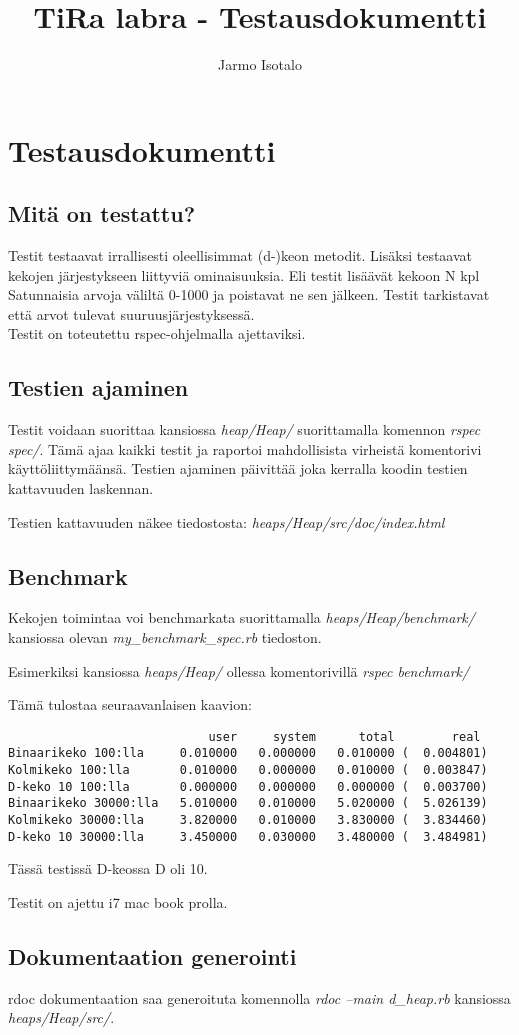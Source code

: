 \documentclass[a4paper,12pt]{article}
\begin{document}
\title{TiRa labra - Testausdokumentti} 
\author{Jarmo Isotalo}
\maketitle

\section{Testausdokumentti}

\subsection{Mitä on testattu?}
Testit testaavat irrallisesti oleellisimmat (d-)keon metodit. Lisäksi testaavat kekojen järjestykseen liittyviä ominaisuuksia. Eli testit lisäävät kekoon N kpl Satunnaisia arvoja väliltä 0-1000 ja poistavat ne sen jälkeen. Testit tarkistavat että arvot tulevat suuruusjärjestyksessä.\\

Testit on toteutettu rspec-ohjelmalla ajettaviksi.

\subsection{Testien ajaminen}
Testit voidaan suorittaa kansiossa  \emph{heap/Heap/} suorittamalla komennon \emph{rspec spec/}. Tämä ajaa kaikki testit ja raportoi mahdollisista virheistä komentorivi käyttöliittymäänsä.
Testien ajaminen päivittää joka kerralla koodin testien kattavuuden laskennan. 

Testien kattavuuden näkee tiedostosta: 
\emph{heaps/Heap/src/doc/index.html} 


\subsection{Benchmark}
Kekojen toimintaa voi benchmarkata suorittamalla \emph{heaps/Heap/benchmark/} kansiossa olevan \emph{my\_benchmark\_spec.rb}  tiedoston.

Esimerkiksi kansiossa \emph{heaps/Heap/} ollessa komentorivillä \emph{rspec benchmark/}

Tämä tulostaa seuraavanlaisen kaavion:

\begin{verbatim}
                            user     system      total        real
Binaarikeko 100:lla     0.010000   0.000000   0.010000 (  0.004801)
Kolmikeko 100:lla       0.010000   0.000000   0.010000 (  0.003847)
D-keko 10 100:lla       0.000000   0.000000   0.000000 (  0.003700)
Binaarikeko 30000:lla   5.010000   0.010000   5.020000 (  5.026139)
Kolmikeko 30000:lla     3.820000   0.010000   3.830000 (  3.834460)
D-keko 10 30000:lla     3.450000   0.030000   3.480000 (  3.484981)
\end{verbatim} 
Tässä testissä D-keossa D oli 10.

Testit on ajettu i7 mac book prolla.

\subsection{Dokumentaation generointi}
rdoc dokumentaation saa generoituta komennolla \emph{rdoc --main d\_heap.rb} kansiossa  \emph{heaps/Heap/src/}.
\end{document}
